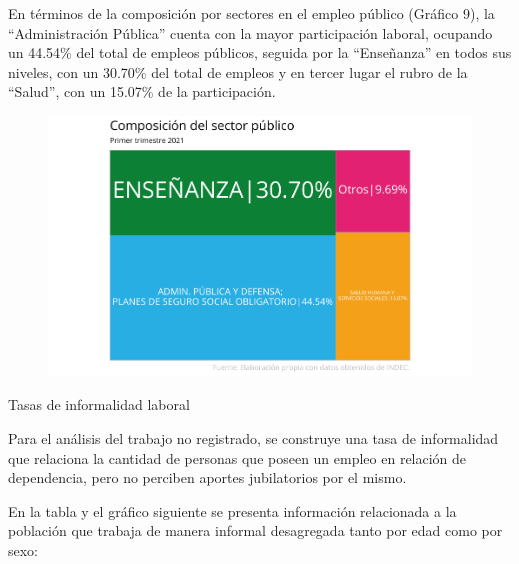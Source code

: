 \documentclass{article}
\begin{document}
En términos de la composición por sectores en el empleo público (Gráfico
9), la ``Administración Pública'' cuenta con la mayor participación
laboral, ocupando un 44.54\% del total de empleos públicos, seguida por
la ``Enseñanza'' en todos sus niveles, con un 30.70\% del total de
empleos y en tercer lugar el rubro de la ``Salud'', con un 15.07\% de la
participación.

\begin{figure}
\includegraphics{Informe-Mercado-Laboral_files/figure-latex/unnamed-chunk-33-1.pdf}
\caption{} 
\end{figure}

\newpage

\textcolor{graycustom}{\Large Tasas de informalidad laboral} \newline

Para el análisis del trabajo no registrado, se construye una tasa de
informalidad que relaciona la cantidad de personas que poseen un empleo
en relación de dependencia, pero no perciben aportes jubilatorios por el
mismo. 

En la tabla y el gráfico siguiente se presenta información
relacionada a la población que trabaja de manera informal desagregada
tanto por edad como por sexo:
\end{document}
